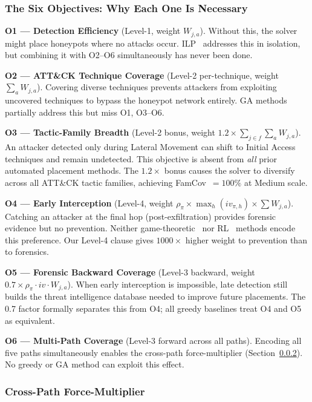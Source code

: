 \documentclass[journal]{IEEEtran}
\begin{document}
\subsubsection{The Six Objectives: Why Each One Is Necessary}
\label{subsubsec:sixobj}

\noindent\textbf{O1 --- Detection Efficiency} (Level-1, weight $W_{j,a}$).
Without this, the solver might place honeypots where no
attacks occur.
ILP~\cite{saha2015} addresses this in isolation, but
combining it with O2--O6 simultaneously has never been done.

\noindent\textbf{O2 --- ATT\&CK Technique Coverage}
(Level-2 per-technique, weight $\sum_a W_{j,a}$).
Covering diverse techniques prevents attackers from
exploiting uncovered techniques to bypass the honeypot
network entirely.
GA methods~\cite{hemberg2020} partially address this but
miss O1, O3--O6.

\noindent\textbf{O3 --- Tactic-Family Breadth}
(Level-2 bonus, weight $1.2\!\times\!\sum_{j\in f}\!\sum_a W_{j,a}$).
An attacker detected only during Lateral Movement can shift
to Initial Access techniques and remain undetected.
This objective is absent from \emph{all} prior automated
placement methods.
The $1.2\times$ bonus causes the solver to diversify across
all ATT\&CK tactic families, achieving FamCov~$=100\%$ at
Medium scale.

\noindent\textbf{O4 --- Early Interception}
(Level-4, weight $\rho_\pi\!\times\!\max_h(iv_{\pi,h})\!\times\!\sum W_{j,a}$).
Catching an attacker at the final hop (post-exfiltration)
provides forensic evidence but no prevention.
Neither game-theoretic~\cite{kiekintveld2015} nor
RL~\cite{huang2019} methods encode this preference.
Our Level-4 clause gives $1000\times$ higher weight to
prevention than to forensics.

\noindent\textbf{O5 --- Forensic Backward Coverage}
(Level-3 backward, weight $0.7\times\rho_\pi\cdot iv\cdot W_{j,a}$).
When early interception is impossible, late detection still
builds the threat intelligence database needed to improve
future placements.
The 0.7 factor formally separates this from O4; all
greedy baselines treat O4 and O5 as equivalent.

\noindent\textbf{O6 --- Multi-Path Coverage}
(Level-3 forward across all paths).
Encoding all five paths simultaneously enables the
cross-path force-multiplier (Section~\ref{subsec:crosspath}).
No greedy or GA method can exploit this effect.

\subsubsection{Cross-Path Force-Multiplier}
\label{subsec:crosspath}
\end{document}
